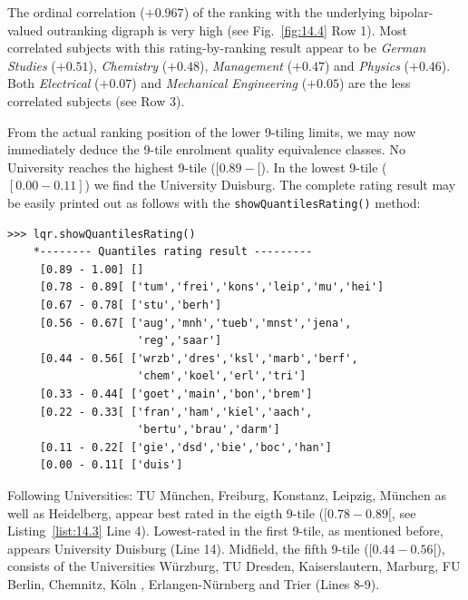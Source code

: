 The ordinal correlation ($+0.967$) of the \Copeland ranking with the underlying bipolar-valued outranking digraph is very high (see Fig.~\vref{fig:14.4} Row 1). Most correlated subjects with this rating-by-ranking result appear to be \emph{German Studies} ($+0.51$), \emph{Chemistry} ($+0.48$), \emph{Management} ($+0.47$) and \emph{Physics} ($+0.46$). Both \emph{Electrical} ($+0.07$) and \emph{Mechanical Engineering} ($+0.05$) are the less correlated subjects (see Row 3).

From the actual ranking position of the lower 9-tiling limits, we may now immediately deduce the 9-tile enrolment quality equivalence classes. No University reaches the highest 9-tile ($[0.89 - [$). In the lowest 9-tile ($[0.00- 0.11]$) we find the University Duisburg. The complete rating result may be easily printed out as follows with the \texttt{showQuantilesRating()} method:
\begin{lstlisting}[caption={Showing the 9-tiling of the enrolment quality of the 41 Universities},label=list:14.3]
>>> lqr.showQuantilesRating()
    *-------- Quantiles rating result ---------
     [0.89 - 1.00] []
     [0.78 - 0.89[ ['tum','frei','kons','leip','mu','hei']
     [0.67 - 0.78[ ['stu','berh']
     [0.56 - 0.67[ ['aug','mnh','tueb','mnst','jena',
                    'reg','saar']
     [0.44 - 0.56[ ['wrzb','dres','ksl','marb','berf',
                    'chem','koel','erl','tri']
     [0.33 - 0.44[ ['goet','main','bon','brem']
     [0.22 - 0.33[ ['fran','ham','kiel','aach',
                    'bertu','brau','darm']
     [0.11 - 0.22[ ['gie','dsd','bie','boc','han']
     [0.00 - 0.11[ ['duis']
\end{lstlisting}

Following Universities: TU München, Freiburg, Konstanz, Leipzig, München as well as Heidelberg, appear best rated in the eigth 9-tile ($[0.78 - 0.89[$, see Listing~\vref{list:14.3} Line 4). Lowest-rated in the first 9-tile, as mentioned before, appears University Duisburg (Line 14). Midfield, the fifth 9-tile ($[0.44 - 0.56[$), consists of the Universities Würzburg, TU Dresden, Kaiserslautern, Marburg, FU Berlin, Chemnitz, Köln , Erlangen-Nürnberg and Trier (Lines 8-9).

